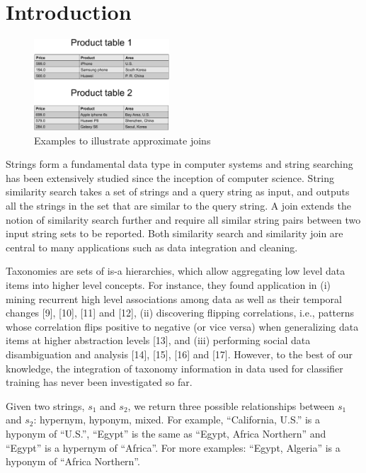 \section{Introduction}


\begin{figure}[t]
\centering
\includegraphics[width=0.45\textwidth]{figures/productexample}
 \caption{Examples to illustrate approximate joins}
\label{fig:autocompletion}
\end{figure}


Strings form a fundamental data type in computer systems and string searching has been extensively studied since the
inception of computer science. String similarity search takes a set of strings and a query string as input, and outputs all
the strings in the set that are similar to the query string. A join extends the notion of similarity search further and require
all similar string pairs between two input string sets to be reported. Both similarity search and similarity join are
central to many applications such as data integration and cleaning.

 Taxonomies are sets of is-a hierarchies, which allow aggregating low level data items into higher level concepts. For instance, they found application in (i) mining recurrent high level associations among data as well as their temporal changes [9], [10], [11] and [12], (ii) discovering flipping correlations, i.e., patterns whose correlation flips positive to negative (or vice versa) when generalizing data items at higher abstraction levels [13], and (iii) performing social data disambiguation and analysis [14], [15], [16] and [17]. However, to the best of our knowledge, the integration of taxonomy information in data used for classifier training has never been investigated so far.




Given two strings, $s_1$ and $s_2$, we return three possible relationships between $s_1$ and $s_2$: hypernym, hyponym, mixed. For example, ``California, U.S.'' is a hyponym of ``U.S.'', ``Egypt'' is the same as ``Egypt, Africa Northern'' and ``Egypt'' is a hypernym of ``Africa''. For more examples: ``Egypt, Algeria'' is a hyponym of ``Africa Northern''.

